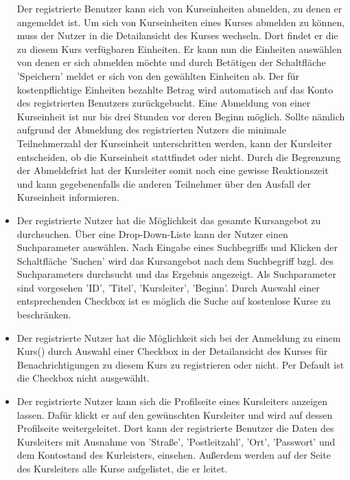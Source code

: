 \documentclass[a4paper]{scrreprt}
\begin{document}
\begin{itemize}
					Der registrierte Benutzer kann sich von Kurseinheiten abmelden, zu denen er angemeldet ist. Um sich von Kurseinheiten eines Kurses abmelden zu können, muss der Nutzer in die Detailansicht des Kurses wechseln. Dort findet er die zu diesem Kurs verfügbaren Einheiten.
					Er kann nun die Einheiten auswählen von denen er sich abmelden möchte und durch Betätigen der Schaltfläche 'Speichern' meldet er sich von den gewählten Einheiten ab. Der für kostenpflichtige Einheiten bezahlte Betrag wird automatisch auf das Konto des registrierten Benutzers zurückgebucht.
					Eine Abmeldung von einer Kurseinheit ist nur bis drei Stunden vor deren Beginn möglich. Sollte nämlich aufgrund der Abmeldung des registrierten Nutzers die minimale Teilnehmerzahl der Kurseinheit unterschritten werden, kann der Kursleiter entscheiden, ob die Kurseinheit stattfindet oder nicht. Durch die Begrenzung der Abmeldefrist hat der Kursleiter somit noch eine gewisse Reaktionszeit und kann gegebenenfalls die anderen Teilnehmer über den Ausfall der Kurseinheit informieren. 
				\item {}
					Der registrierte Nutzer hat die Möglichkeit das gesamte Kursangebot zu durchsuchen. Über eine Drop-Down-Liste kann der Nutzer einen Suchparameter auswählen. Nach Eingabe eines Suchbegriffs und Klicken der Schaltfläche 'Suchen' wird das Kursangebot nach dem Suchbegriff bzgl. des Suchparameters durchsucht und das Ergebnis angezeigt. 
					Als Suchparameter sind vorgesehen 'ID', 'Titel', 'Kursleiter', 'Beginn'. Durch Auswahl einer entsprechenden Checkbox ist es möglich die Suche auf kostenlose Kurse zu beschränken.
				\item {}
					Der registrierte Nutzer hat die Möglichkeit sich bei der Anmeldung zu einem Kurs() durch Auswahl einer Checkbox in der Detailansicht des Kurses für Benachrichtigungen zu diesem Kurs zu registrieren oder nicht. Per Default ist die Checkbox nicht ausgewählt.
				\item {}
				    Der registrierte Nutzer kann sich die Profilseite eines Kursleiters anzeigen lassen. Dafür klickt er auf den gewünschten Kursleiter und wird auf dessen Profilseite weitergeleitet. Dort kann der registrierte Benutzer die Daten des Kursleiters mit Ausnahme von 'Straße', 'Postleitzahl', 'Ort', 'Passwort' und dem Kontostand des Kurleisters, einsehen. Außerdem werden auf der Seite des Kursleiters alle Kurse aufgelistet, die er leitet.
			\end{itemize}
\end{document}
